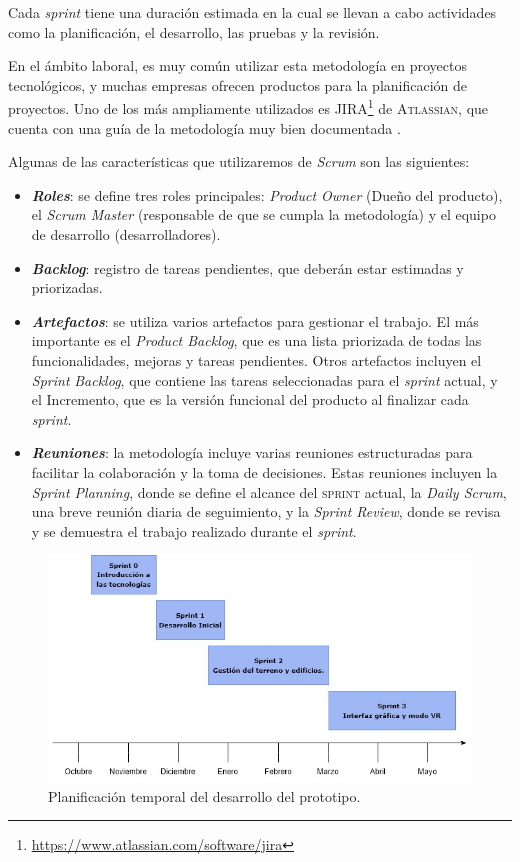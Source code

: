 \documentclass[a4paper, 11pt]{book}
\begin{document}
Cada \emph{sprint} tiene una duración estimada en la cual se llevan a cabo actividades como la planificación, el desarrollo, las pruebas y la revisión.

En el ámbito laboral, es muy común utilizar esta metodología en proyectos tecnológicos, y muchas empresas ofrecen productos para la planificación de proyectos. Uno de los más ampliamente utilizados es \textsc{JIRA}\footnote{\url{https://www.atlassian.com/software/jira}} de \textsc{Atlassian}, que cuenta con una guía de la metodología muy bien documentada \cite{scrumGuide}.

Algunas de las características que utilizaremos de \emph{Scrum} son las siguientes:
\begin{itemize}
\item \textbf{\emph{Roles}}: se define tres roles principales: \emph{Product Owner} (Dueño del producto), el \emph{Scrum Master} (responsable de que se cumpla la metodología) y el equipo de desarrollo (desarrolladores).
\item \textbf{\emph{Backlog}}: registro de tareas pendientes, que deberán estar estimadas y priorizadas.
\item \textbf{\emph{Artefactos}}: se utiliza varios artefactos para gestionar el trabajo. El más importante es el \emph{Product Backlog}, que es una lista priorizada de todas las funcionalidades, mejoras y tareas pendientes. Otros artefactos incluyen el \emph{Sprint} \emph{Backlog}, que contiene las tareas seleccionadas para el \emph{sprint} actual, y el Incremento, que es la versión funcional del producto al finalizar cada \emph{sprint}.
\item \textbf{\emph{Reuniones}}: la metodología incluye varias reuniones estructuradas para facilitar la colaboración y la toma de decisiones. Estas reuniones incluyen la \emph{Sprint Planning}, donde se define el alcance del \textsc{sprint} actual, la \emph{Daily Scrum}, una breve reunión diaria de seguimiento, y la \emph{Sprint Review}, donde se revisa y se demuestra el trabajo realizado durante el \emph{sprint}.
\end{itemize}

\begin{figure}[h]
  \centering
  \includegraphics[width=12cm, keepaspectratio]{img/scrum.jpg}
  \caption{Planificación temporal del desarrollo del prototipo.}
  \label{fig:scrum}
\end{figure}
\end{document}
